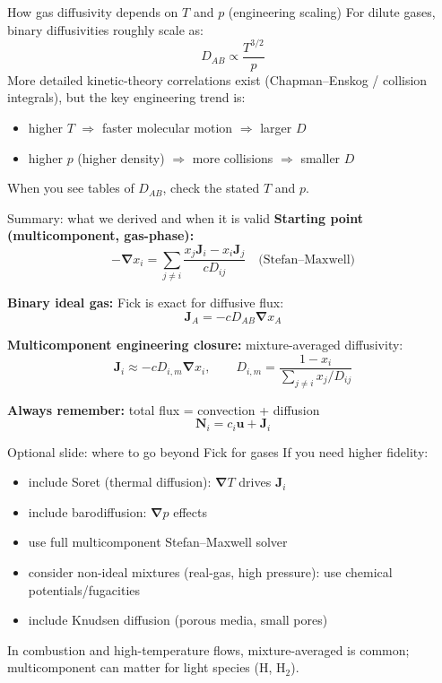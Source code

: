 \documentclass[aspectratio=169]{beamer}
\newcommand{\grad}{\bm{\nabla}}
\newcommand{\J}{\bm{J}}
\newcommand{\N}{\bm{N}}
\newcommand{\uvec}{\bm{u}}
\begin{document}
\begin{frame}{How gas diffusivity depends on $T$ and $p$ (engineering scaling)}
For dilute gases, binary diffusivities roughly scale as:
\[
D_{AB} \propto \frac{T^{3/2}}{p}
\]
More detailed kinetic-theory correlations exist (Chapman--Enskog / collision integrals),
but the key engineering trend is:

\begin{itemize}
  \item higher $T$ $\Rightarrow$ faster molecular motion $\Rightarrow$ larger $D$
  \item higher $p$ (higher density) $\Rightarrow$ more collisions $\Rightarrow$ smaller $D$
\end{itemize}

\vspace{0.2cm}
When you see tables of $D_{AB}$, check the stated $T$ and $p$.
\end{frame}

\begin{frame}{Summary: what we derived and when it is valid}
\textbf{Starting point (multicomponent, gas-phase):}
\[
-\grad x_i = \sum_{j\neq i}\frac{x_j \J_i - x_i \J_j}{cD_{ij}}
\quad\text{(Stefan--Maxwell)}
\]

\textbf{Binary ideal gas:} Fick is exact for diffusive flux:
\[
\J_A = -cD_{AB}\grad x_A
\]

\textbf{Multicomponent engineering closure:} mixture-averaged diffusivity:
\[
\J_i \approx -cD_{i,m}\grad x_i,\qquad
D_{i,m} = \frac{1-x_i}{\sum_{j\neq i}x_j/D_{ij}}
\]

\textbf{Always remember:} total flux = convection + diffusion
\[
\N_i = c_i\uvec + \J_i
\]
\end{frame}

\begin{frame}{Optional slide: where to go beyond Fick for gases}
If you need higher fidelity:
\begin{itemize}
  \item include Soret (thermal diffusion): $\grad T$ drives $\J_i$
  \item include barodiffusion: $\grad p$ effects
  \item use full multicomponent Stefan--Maxwell solver
  \item consider non-ideal mixtures (real-gas, high pressure): use chemical potentials/fugacities
  \item include Knudsen diffusion (porous media, small pores)
\end{itemize}

\vspace{0.25cm}
In combustion and high-temperature flows, mixture-averaged is common; multicomponent can matter for light species (H, H$_2$).
\end{frame}
\end{document}
